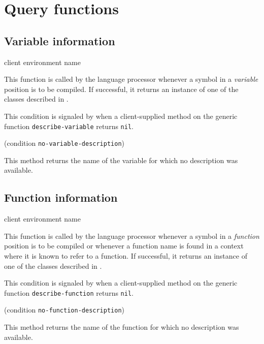\section{Query functions}
\label{sec-querying-query-functions}

\subsection{Variable information}

{\footnotesize
{} {client environment name}
}

This function is called by the language processor whenever a symbol in
a \emph{variable} position is to be compiled.  If successful, it
returns an instance of one of the classes described in
.

{\footnotesize
{}
}

This condition is signaled by \sysname{} when a client-supplied method
on the generic function \texttt{describe-variable} returns \texttt{nil}.

{\footnotesize
{} {(condition {\tt no-variable-description})}
}

This method returns the name of the variable for which no description was
available.

\subsection{Function information}

{\footnotesize
{} {client environment name}
}

This function is called by the language processor whenever a symbol in
a \emph{function} position is to be compiled or whenever a function
name is found in a context where it is known to refer to a function.
If successful, it returns an instance of one of the classes described
in .

{\footnotesize
{}
}

This condition is signaled by \sysname{} when a client-supplied method
on the generic function \texttt{describe-function} returns \texttt{nil}.

{\footnotesize
{} {(condition {\tt no-function-description})}
}

This method returns the name of the function for which no description was
available.

